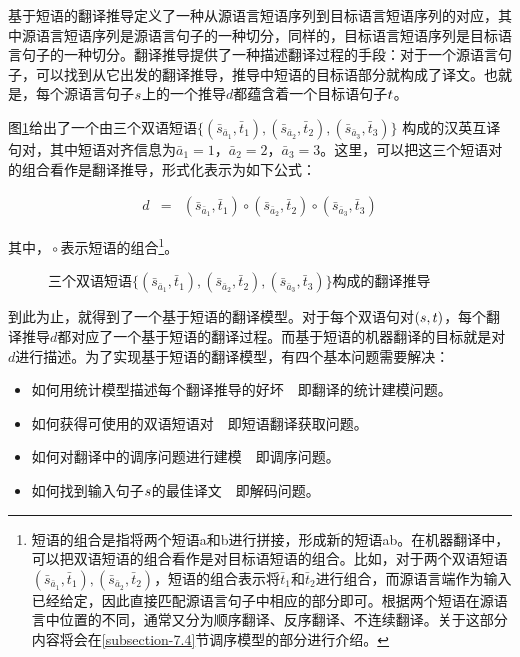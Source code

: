 \parinterval 基于短语的翻译推导定义了一种从源语言短语序列到目标语言短语序列的对应，其中源语言短语序列是源语言句子的一种切分，同样的，目标语言短语序列是目标语言句子的一种切分。翻译推导提供了一种描述翻译过程的手段：对于一个源语言句子，可以找到从它出发的翻译推导，推导中短语的目标语部分就构成了译文。也就是，每个源语言句子${s}$上的一个推导$d$都蕴含着一个目标语句子${t}$。

\parinterval 图\ref{fig:7-7}给出了一个由三个双语短语$\{(\bar{s}_{\bar{a}_1},\bar{t}_1),(\bar{s}_{\bar{a}_2},\bar{t}_2),(\bar{s}_{\bar{a}_3},\bar{t}_3)\}$ 构成的汉英互译句对，其中短语对齐信息为$\bar{a}_1 = 1$，$\bar{a}_2 = 2$，$\bar{a}_3 = 3$。这里，可以把这三个短语对的组合看作是翻译推导，形式化表示为如下公式：

\begin{eqnarray}
d & = & {(\bar{s}_{\bar{a}_1},\bar{t}_1)} \circ {(\bar{s}_{\bar{a}_2},\bar{t}_2)} \circ {(\bar{s}_{\bar{a}_3},\bar{t}_3)}
\label{eq:7-1}
\end{eqnarray}

\noindent 其中，${} \circ $表示短语的组合\footnote[2]{短语的组合是指将两个短语a和b进行拼接，形成新的短语ab。在机器翻译中，可以把双语短语的组合看作是对目标语短语的组合。比如，对于两个双语短语$(\bar{s}_{\bar{a}_1},\bar{t}_1),(\bar{s}_{\bar{a}_2},\bar{t}_2)$，短语的组合表示将$\bar{t}_1$和$\bar{t}_2$进行组合，而源语言端作为输入已经给定，因此直接匹配源语言句子中相应的部分即可。根据两个短语在源语言中位置的不同，通常又分为顺序翻译、反序翻译、不连续翻译。关于这部分内容将会在\ref{subsection-7.4}节调序模型的部分进行介绍。}。

\begin{figure}[htp]
\centering

\caption{三个双语短语$\{(\bar{s}_{\bar{a}_1},\bar{t}_1),(\bar{s}_{\bar{a}_2},\bar{t}_2),(\bar{s}_{\bar{a}_3},\bar{t}_3)\}$构成的翻译推导}
\label{fig:7-7}
\end{figure}

\parinterval 到此为止，就得到了一个基于短语的翻译模型。对于每个双语句对$({s}, {t})$，每个翻译推导$d$都对应了一个基于短语的翻译过程。而基于短语的机器翻译的目标就是对$d$进行描述。为了实现基于短语的翻译模型，有四个基本问题需要解决：

\begin{itemize}
\vspace{0.5em}
\item 如何用统计模型描述每个翻译推导的好坏\ \dash \ 即翻译的统计建模问题。
\vspace{0.5em}
\item 如何获得可使用的双语短语对\ \dash \ 即短语翻译获取问题。
\vspace{0.5em}
\item 如何对翻译中的调序问题进行建模\ \dash \ 即调序问题。
\vspace{0.5em}
\item 如何找到输入句子${s}$的最佳译文\ \dash \ 即解码问题。
\vspace{0.5em}
\end{itemize}

